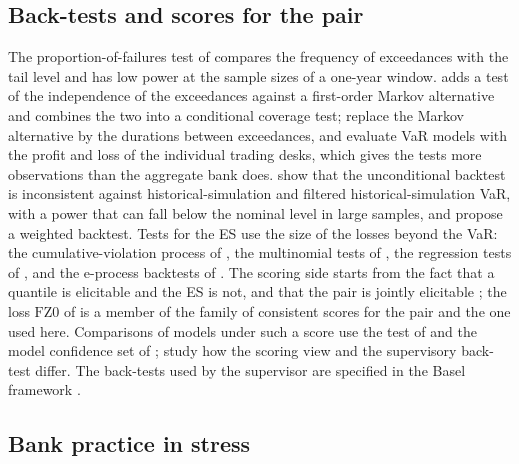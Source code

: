 \subsection{Back-tests and scores for the pair}
\label{sec:rw-backtests}

The proportion-of-failures test of \citet{kupiec1995} compares the frequency of exceedances with the tail level and has low power at the sample sizes of a one-year window. \citet{christoffersen1998} adds a test of the independence of the exceedances against a first-order Markov alternative and combines the two into a conditional coverage test; \citet{christoffersenpelletier2004} replace the Markov alternative by the durations between exceedances, and \citet{berkowitz2011} evaluate VaR models with the profit and loss of the individual trading desks, which gives the tests more observations than the aggregate bank does. \citet{escanciano2012} show that the unconditional backtest is inconsistent against historical-simulation and filtered historical-simulation VaR, with a power that can fall below the nominal level in large samples, and propose a weighted backtest. Tests for the ES use the size of the losses beyond the VaR: the cumulative-violation process of \citet{duescanciano2017}, the multinomial tests of \citet{kratz2018}, the regression tests of \citet{bayer2022}, and the e-process backtests of \citet{wang2022}. The scoring side starts from the fact that a quantile is elicitable and the ES is not, and that the pair is jointly elicitable \citep{gneiting2011,fisslerziegelgneiting2016,fissler2016,ziegel2016}; the loss $\mathrm{FZ0}$ of \citet{pattonziegelchen2019} is a member of the family of consistent scores for the pair and the one used here. Comparisons of models under such a score use the test of \citet{diebold1995} and the model confidence set of \citet{hansen2011}; \citet{noldeziegel2017} study how the scoring view and the supervisory back-test differ. The back-tests used by the supervisor are specified in the Basel framework \citep{bcbsmar32,bcbsmar33}.

\subsection{Bank practice in stress}
\label{sec:rw-practice}

